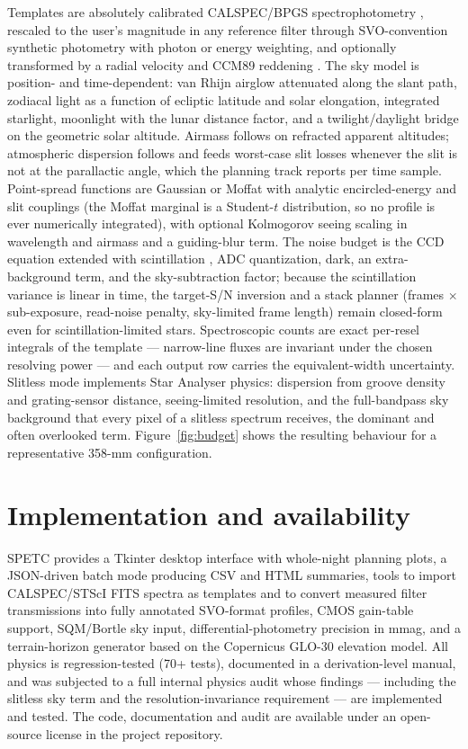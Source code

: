 \documentclass[11pt, a4paper]{article}
\begin{document}
Templates are absolutely calibrated CALSPEC/BPGS spectrophotometry
\citep{bohlin2014}, rescaled to the user's magnitude in any reference
filter through SVO-convention synthetic photometry \citep{rodrigo2020}
with photon or energy weighting, and optionally transformed by a radial
velocity and CCM89 reddening \citep{cardelli1989}. The sky model is
position- and time-dependent: van Rhijn airglow attenuated along the
slant path, zodiacal light as a function of ecliptic latitude and solar
elongation, integrated starlight, \citet{krisciunas1991} moonlight with
the lunar distance factor, and a twilight/daylight bridge on the
geometric solar altitude. Airmass follows \citet{pickering2002} on
refracted apparent altitudes; atmospheric dispersion follows
\citet{filippenko1982} and feeds worst-case slit losses whenever the slit
is not at the parallactic angle, which the planning track reports per
time sample. Point-spread functions are Gaussian or Moffat with analytic
encircled-energy and slit couplings (the Moffat marginal is a Student-$t$
distribution, so no profile is ever numerically integrated), with
optional Kolmogorov seeing scaling in wavelength and airmass and a
guiding-blur term. The noise budget is the CCD equation extended with
scintillation \citep{young1967,osborn2015}, ADC quantization, dark, an
extra-background term, and the \citet{merline1995} sky-subtraction
factor; because the scintillation variance is linear in time, the
target-S/N inversion and a stack planner (frames $\times$ sub-exposure,
read-noise penalty, sky-limited frame length) remain closed-form even
for scintillation-limited stars. Spectroscopic counts are exact per-resel
integrals of the template --- narrow-line fluxes are invariant under the
chosen resolving power --- and each output row carries the
\citet{cayrel1988} equivalent-width uncertainty. Slitless mode implements
Star Analyser physics: dispersion from groove density and grating-sensor
distance, seeing-limited resolution, and the full-bandpass sky background
that every pixel of a slitless spectrum receives, the dominant and often
overlooked term. Figure~\ref{fig:budget} shows the resulting behaviour
for a representative 358-mm configuration.

\section{Implementation and availability}

SPETC provides a Tkinter desktop interface with whole-night planning
plots, a JSON-driven batch mode producing CSV and HTML summaries, tools
to import CALSPEC/STScI FITS spectra as templates and to convert measured
filter transmissions into fully annotated SVO-format profiles, CMOS
gain-table support, SQM/Bortle sky input, differential-photometry
precision in mmag, and a terrain-horizon generator based on the
Copernicus GLO-30 elevation model. All physics is regression-tested
(70+ tests), documented in a derivation-level manual, and was subjected
to a full internal physics audit whose findings --- including the
slitless sky term and the resolution-invariance requirement --- are
implemented and tested. The code, documentation and audit are available
under an open-source license in the project repository.
\end{document}
